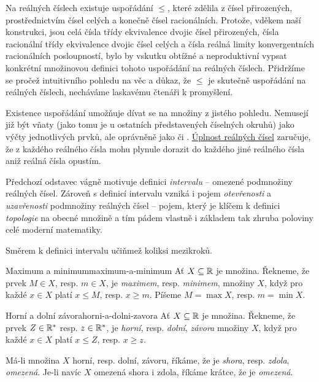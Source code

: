 Na reálných číslech existuje uspořádání $ \leq $, které zdělila z čísel
přirozených, prostřednictvím čísel celých a konečně čísel racionálních. Protože,
vděkem naší konstrukci, jsou celá čísla třídy ekvivalence dvojic čísel
přirozených, čísla racionální třídy ekvivalence dvojic čísel celých a čísla
reálná limity konvergentních racionálních posloupností, bylo by vskutku obtížné
a neproduktivní vypsat konkrétní množinovou definici tohoto uspořádání na
reálných číslech. Přidržíme se pročež intuitivního pohledu na věc a důkaz, že
$ \leq $ je skutečně uspořádání na reálných číslech, necháváme laskavému čtenáři
k promyšlení.

Existence uspořádání umožňuje dívat se na množiny z jistého 
pohledu. Nemusejí již být vňaty (jako tomu je u ostatních představených
číselných okruhů) jako výčty jednotlivých prvků, ale oprávněně jako
 či . \hyperref[cor:r-jsou-uplna]{Úplnost reálných
čísel} zaručuje, že z každého reálného čísla mohu plynule dorazit do každého
jiné reálného čísla aniž reálná čísla opustím.

Předchozí odstavec vágně motivuje definici \emph{intervalu} -- 
omezené podmnožiny reálných čísel. Zároveň s definicí intervalu vzniká i pojem
\emph{otevřenosti} a \emph{uzavřenosti} podmnožiny reálných čísel -- pojem,
který je klíčem k definici \emph{topologie} na obecné množině a tím pádem
vlastně i základem tak zhruba poloviny celé moderní matematiky.

Směrem k definici intervalu učiňmež koliksi mezikroků.

\begin{definition}{Maximum a minimum}{maximum-a-minimum}
 Ať $X \subseteq \mathbb{R}$ je množina. Řekneme, že prvek $M \in X$, resp. $m \in X$,
 je \emph{maximem}, resp. \emph{minimem}, množiny $X$, když pro každé $x \in X$
 platí $x \leq M$, resp. $x \geq m$. Píšeme $M = \max X$, resp. $m = \min X$.
\end{definition}

\begin{definition}{Horní a dolní závora}{horni-a-dolni-zavora}
 Ať $X \subseteq \mathbb{R}$ je množina. Řekneme, že prvek $Z \in \mathbb{R}^{*}$ resp. $z \in
 \mathbb{R}^{*}$, je \emph{horní}, resp. \emph{dolní}, \emph{závora} množiny $X$, když
 pro každé $x \in X$ platí $x \leq Z$, resp. $x \geq z$.

 Má-li množina $X$ horní, resp. dolní, závoru, říkáme, že je \emph{shora}, resp.
 \emph{zdola}, \emph{omezená}. Je-li navíc $X$ omezená shora i zdola, říkáme
 krátce, že je \emph{omezená}.
\end{definition}

